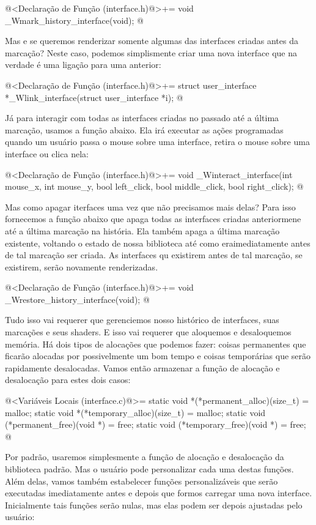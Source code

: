\iniciocodigo
@<Declaração de Função (interface.h)@>+=
void _Wmark_history_interface(void);
@
\fimcodigo

Mas e se queremos renderizar somente algumas das interfaces criadas
antes da marcação? Neste caso, podemos simplismente criar uma nova
interface que na verdade é uma ligação para uma anterior:

\iniciocodigo
@<Declaração de Função (interface.h)@>+=
struct user_interface *_Wlink_interface(struct user_interface *i);
@
\fimcodigo

Já para interagir com todas as interfaces criadas no passado até a
última marcação, usamos a função abaixo. Ela irá executar as ações
programadas quando um usuário passa o mouse sobre uma interface,
retira o mouse sobre uma interface ou clica nela:

\iniciocodigo
@<Declaração de Função (interface.h)@>+=
void _Winteract_interface(int mouse_x, int mouse_y, bool left_click,
                          bool middle_click, bool right_click);
@
\fimcodigo


Mas como apagar iterfaces uma vez que não precisamos mais delas? Para
isso fornecemos a função abaixo que apaga todas as interfaces criadas
anteriormene até a última marcação na história. Ela também apaga a
última marcação existente, voltando o estado de nossa biblioteca até
como eraimediatamente antes de tal marcação ser criada. As interfaces
qu existirem antes de tal marcação, se existirem, serão novamente
renderizadas.

\iniciocodigo
@<Declaração de Função (interface.h)@>+=
void _Wrestore_history_interface(void);
@
\fimcodigo

Tudo isso vai requerer que gerenciemos nosso histórico de interfaces,
suas marcações e seus shaders. E isso vai requerer que aloquemos e
desaloquemos memória. Há dois tipos de alocações que podemos fazer:
coisas permanentes que ficarão alocadas por possivelmente um bom tempo
e coisas temporárias que serão rapidamente desalocadas. Vamos então
armazenar a função de alocação e desalocação para estes dois casos:

\iniciocodigo
@<Variáveis Locais (interface.c)@>=
static void *(*permanent_alloc)(size_t) = malloc;
static void *(*temporary_alloc)(size_t) = malloc;
static void (*permanent_free)(void *) = free;
static void (*temporary_free)(void *) = free;
@
\fimcodigo

Por padrão, usaremos simplesmente a função de alocação e desalocação
da biblioteca padrão. Mas o usuário pode personalizar cada uma destas
funções. Além delas, vamos também estabelecer funções personalizáveis
que serão executadas imediatamente antes e depois que formos carregar
uma nova interface. Inicialmente tais funções serão nulas, mas elas
podem ser depois ajustadas pelo usuário:

